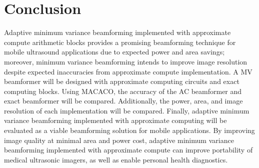 \documentclass[journal]{IEEEtran}
\begin{document}
%






\section{Conclusion}

Adaptive minimum variance beamforming implemented with approximate compute arithmetic blocks provides a promising beamforming technique for mobile ultrasound applications due to expected power and area savings; moreover, minimum variance beamforming intends to improve image resolution despite expected inaccuracies from approximate compute implementation. A MV beamformer will be designed with approximate computing circuits and exact computing blocks. Using MACACO, the accuracy of the AC beamformer and exact beamformer will be compared. Additionally, the power, area, and image resolution of each implementation will be compared. Finally, adaptive minimum variance beamforming implemented with approximate computing will be evaluated as a viable beamforming solution for mobile applications. By improving image quality at minimal area and power cost, adaptive minimum variance beamforming implemented with approximate compute can improve portability of medical ultrasonic imagers, as well as enable personal health diagnostics. 
\end{document}
